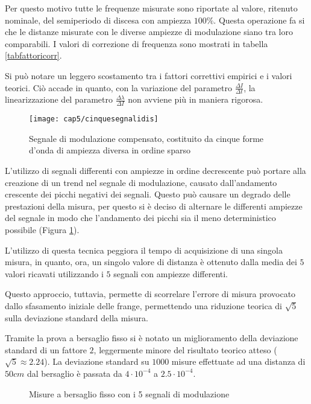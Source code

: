 Per questo motivo tutte le frequenze misurate sono riportate al valore, ritenuto nominale, del semiperiodo di discesa con ampiezza $100\%$. Questa operazione fa si che le distanze misurate con le diverse ampiezze di modulazione siano tra loro comparabili. I valori di correzione di frequenza sono mostrati in tabella \ref{tabfattoricorr}.

Si può notare un leggero scostamento tra i fattori correttivi empirici e i valori teorici. Ciò accade in quanto, con la variazione del parametro $\frac{\Delta I}{\Delta t}$, la linearizzazione del parametro $\frac{\Delta \lambda}{\Delta I}$ non avviene più in maniera rigorosa.
\begin{figure}  
  \begin{center}
    \texttt{[image: cap5/cinquesegnalidis]}
    \caption{Segnale di modulazione compensato, costituito da cinque forme d'onda di ampiezza diversa in ordine sparso}
    \label{cinquesegnalidis}
  \end{center}
\end{figure}

L'utilizzo di segnali differenti con ampiezze in ordine decrescente può portare alla creazione di un trend nel segnale di modulazione, causato dall'andamento crescente dei picchi negativi dei segnali. Questo può causare un degrado delle prestazioni della misura, per questo si è deciso di alternare le differenti ampiezze del segnale in modo che l'andamento dei picchi sia il meno deterministico possibile (Figura \ref{cinquesegnalidis}).

L'utilizzo di questa tecnica peggiora il tempo di acquisizione di una singola misura, in quanto, ora, un singolo valore di distanza è ottenuto dalla media dei $5$ valori ricavati utilizzando i $5$ segnali con ampiezze differenti.

Questo approccio, tuttavia, permette di scorrelare l'errore di misura provocato dallo sfasamento iniziale delle frange, permettendo una riduzione teorica di $\sqrt{5}$ sulla deviazione standard della misura. 

Tramite la prova a bersaglio fisso si è notato un miglioramento della deviazione standard di un fattore $2$, leggermente minore del risultato teorico atteso ($\sqrt{5} \approx 2.24$). La deviazione standard su $1000$ misure effettuate ad una distanza di $50 cm$ dal bersaglio è passata da $4 \cdot 10^{-4}$ a $2.5 \cdot 10^{-4}$. 

\begin{figure}
\centering
{}
\hspace{5mm}
\caption{Misure a bersaglio fisso con i 5 segnali di modulazione}\label{misfisso4}
\end{figure}

